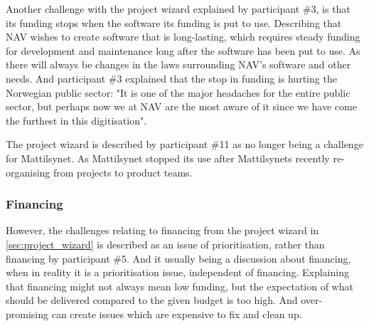 Another challenge with the project wizard explained by participant \#3, is that its funding stops when the software its funding is put to use. Describing that NAV wishes to create software that is long-lasting, which requires steady funding for development and maintenance long after the software has been put to use. As there will always be changes in the laws surrounding NAV's software and other needs. And participant \#3 explained that the stop in funding is hurting the Norwegian public sector: "It is one of the major headaches for the entire public sector, but perhaps now we at NAV are the most aware of it since we have come the furthest in this digitisation".


The project wizard is described by participant \#11 as no longer being a challenge for Mattilsynet. As Mattilsynet stopped its use after Mattilsynets recently re-organising from projects to product teams.

\subsubsection{Financing} \label{sec:financing}
However, the challenges relating to financing from the project wizard in \autoref{sec:project_wizard} is described as an issue of prioritisation, rather than financing by participant \#5. And it usually being a discussion about financing, when in reality it is a prioritisation issue, independent of financing. Explaining that financing might not always mean low funding, but the expectation of what should be delivered compared to the given budget is too high. And over-promising can create issues which are expensive to fix and clean up.


